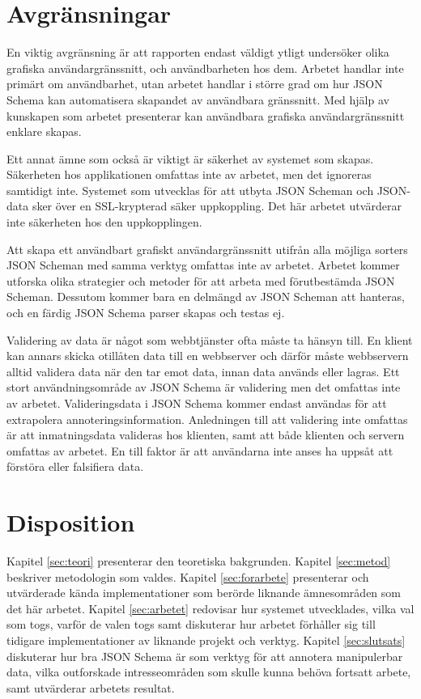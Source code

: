 \section{Avgränsningar}
\label{sec:intro:avgränsningar}
En viktig avgränsning är att rapporten endast väldigt ytligt undersöker olika grafiska användargränssnitt, och användbarheten hos dem. Arbetet handlar inte primärt om användbarhet, utan arbetet handlar i större grad om hur JSON Schema kan automatisera skapandet av användbara gränssnitt. Med hjälp av kunskapen som arbetet presenterar kan användbara grafiska användargränssnitt enklare skapas.

Ett annat ämne som också är viktigt är säkerhet av systemet som skapas. Säkerheten hos applikationen omfattas inte av arbetet, men det ignoreras samtidigt inte. Systemet som utvecklas för att utbyta JSON Scheman och JSON-data sker över en SSL-krypterad säker uppkoppling. Det här arbetet utvärderar inte säkerheten hos den uppkopplingen.

Att skapa ett användbart grafiskt användargränssnitt utifrån alla möjliga sorters JSON Scheman med samma verktyg omfattas inte av arbetet. Arbetet kommer utforska olika strategier och metoder för att arbeta med förutbestämda JSON Scheman. Dessutom kommer bara en delmängd av JSON Scheman att hanteras, och en färdig JSON Schema parser skapas och testas ej.

Validering av data är något som webbtjänster ofta måste ta hänsyn till. En klient kan annars skicka otillåten data till en webbserver och därför måste webbservern alltid validera data när den tar emot data, innan data används eller lagras. Ett stort användningsområde av JSON Schema är validering men det omfattas inte av arbetet. Valideringsdata i JSON Schema kommer endast användas för att extrapolera annoteringsinformation. Anledningen till att validering inte omfattas är att inmatningsdata valideras hos klienten, samt att både klienten och servern omfattas av arbetet. En till faktor är att användarna inte anses ha uppsåt att förstöra eller falsifiera data.

\section{Disposition}
\label{sec:intro:disposition}
Kapitel \ref{sec:teori} presenterar den teoretiska bakgrunden. Kapitel \ref{sec:metod} beskriver metodologin som valdes. Kapitel \ref{sec:forarbete} presenterar och utvärderade kända implementationer som berörde liknande ämnesområden som det här arbetet. Kapitel \ref{sec:arbetet} redovisar hur systemet utvecklades, vilka val som togs, varför de valen togs samt diskuterar hur arbetet förhåller sig till tidigare implementationer av liknande projekt och verktyg. Kapitel \ref{sec:slutsats} diskuterar hur bra JSON Schema är som verktyg för att annotera manipulerbar data, vilka outforskade intresseområden som skulle kunna behöva fortsatt arbete, samt utvärderar arbetets resultat.